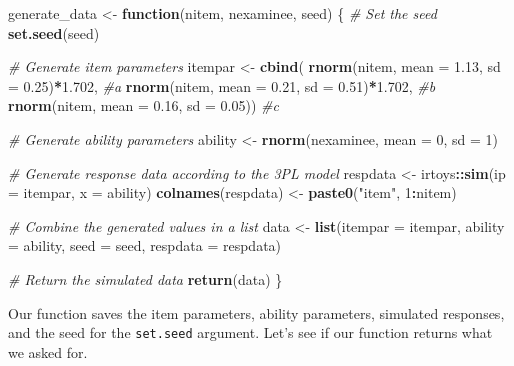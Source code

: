 \documentclass[
]{book}
\newenvironment{Shaded}{\begin{snugshade}}{\end{snugshade}}
\newcommand{\CommentTok}[1]{\textcolor[rgb]{0.56,0.35,0.01}{\textit{#1}}}
\newcommand{\ControlFlowTok}[1]{\textcolor[rgb]{0.13,0.29,0.53}{\textbf{#1}}}
\newcommand{\DataTypeTok}[1]{\textcolor[rgb]{0.13,0.29,0.53}{#1}}
\newcommand{\DecValTok}[1]{\textcolor[rgb]{0.00,0.00,0.81}{#1}}
\newcommand{\FloatTok}[1]{\textcolor[rgb]{0.00,0.00,0.81}{#1}}
\newcommand{\KeywordTok}[1]{\textcolor[rgb]{0.13,0.29,0.53}{\textbf{#1}}}
\newcommand{\NormalTok}[1]{#1}
\newcommand{\OperatorTok}[1]{\textcolor[rgb]{0.81,0.36,0.00}{\textbf{#1}}}
\newcommand{\StringTok}[1]{\textcolor[rgb]{0.31,0.60,0.02}{#1}}
\begin{document}
\begin{Shaded}
\begin{Highlighting}[]
\NormalTok{generate_data <-}\StringTok{ }\ControlFlowTok{function}\NormalTok{(nitem, nexaminee, seed) \{}
  \CommentTok{# Set the seed }
  \KeywordTok{set.seed}\NormalTok{(seed)}

  \CommentTok{# Generate item parameters}
\NormalTok{  itempar <-}\StringTok{ }\KeywordTok{cbind}\NormalTok{(}
    \KeywordTok{rnorm}\NormalTok{(nitem, }\DataTypeTok{mean =} \FloatTok{1.13}\NormalTok{, }\DataTypeTok{sd =} \FloatTok{0.25}\NormalTok{)}\OperatorTok{*}\FloatTok{1.702}\NormalTok{, }\CommentTok{#a}
    \KeywordTok{rnorm}\NormalTok{(nitem, }\DataTypeTok{mean =} \FloatTok{0.21}\NormalTok{, }\DataTypeTok{sd =} \FloatTok{0.51}\NormalTok{)}\OperatorTok{*}\FloatTok{1.702}\NormalTok{, }\CommentTok{#b}
    \KeywordTok{rnorm}\NormalTok{(nitem, }\DataTypeTok{mean =} \FloatTok{0.16}\NormalTok{, }\DataTypeTok{sd =} \FloatTok{0.05}\NormalTok{))       }\CommentTok{#c}
  
  \CommentTok{# Generate ability parameters}
\NormalTok{  ability <-}\StringTok{ }\KeywordTok{rnorm}\NormalTok{(nexaminee, }\DataTypeTok{mean =} \DecValTok{0}\NormalTok{, }\DataTypeTok{sd =} \DecValTok{1}\NormalTok{)}
  
  \CommentTok{# Generate response data according to the 3PL model}
\NormalTok{  respdata <-}\StringTok{ }\NormalTok{irtoys}\OperatorTok{::}\KeywordTok{sim}\NormalTok{(}\DataTypeTok{ip =}\NormalTok{ itempar, }\DataTypeTok{x =}\NormalTok{ ability)}
  \KeywordTok{colnames}\NormalTok{(respdata) <-}\StringTok{ }\KeywordTok{paste0}\NormalTok{(}\StringTok{"item"}\NormalTok{, }\DecValTok{1}\OperatorTok{:}\NormalTok{nitem)}
  
  \CommentTok{# Combine the generated values in a list}
\NormalTok{  data <-}\StringTok{ }\KeywordTok{list}\NormalTok{(}\DataTypeTok{itempar =}\NormalTok{ itempar,}
               \DataTypeTok{ability =}\NormalTok{ ability,}
               \DataTypeTok{seed =}\NormalTok{ seed,}
               \DataTypeTok{respdata =}\NormalTok{ respdata)}
  
  \CommentTok{# Return the simulated data}
  \KeywordTok{return}\NormalTok{(data)}
\NormalTok{\}}
\end{Highlighting}
\end{Shaded}

Our function saves the item parameters, ability parameters, simulated responses, and the seed for the \texttt{set.seed} argument. Let's see if our function returns what we asked for.
\end{document}
